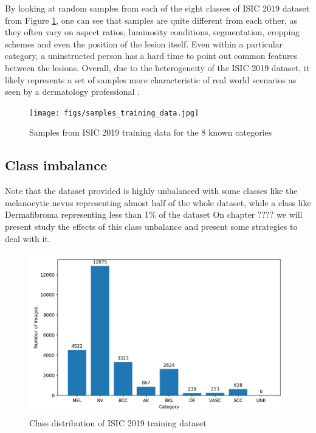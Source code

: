     By looking at random samples from each of the eight classes of ISIC 2019 dataset from Figure \ref{fig:samples}, one can see that samples are quite different from each other, as they often vary on aspect ratios, luminosity conditions, segmentation, cropping schemes and even the position of the lesion itself. Even within a particular category, a uninstructed person has a hard time to point out common features between the lesions. Overall, due to the heterogeneity of the ISIC 2019 dataset, it likely represents a set of samples more characteristic of real world scenarios as seen by a dermatology professional \cite{?}.  \par
    
    \begin{figure}
      \texttt{[image: figs/samples\_training\_data.jpg]}
      \caption{Samples from ISIC 2019 training data for the 8 known categories}
      \label{fig:samples}
    \end{figure}
    
\subsection{Class imbalance}
\label{subsection:imbalance}

    Note that the dataset provided is highly unbalanced with some classes like the melanocytic nevus representing almost half of the whole dataset, while a class like Dermafibroma representing less than 1\% of the dataset On chapter ???? we will present study the effects of this class unbalance and present some strategies to deal with it. \par
    
    \begin{figure}[h!]
      \includegraphics[width=\textwidth,keepaspectratio]{figs/training_data_distribution.jpg}
      \caption{Class distribution of ISIC 2019 training dataset}
      \label{fig:distribution}
    \end{figure}

